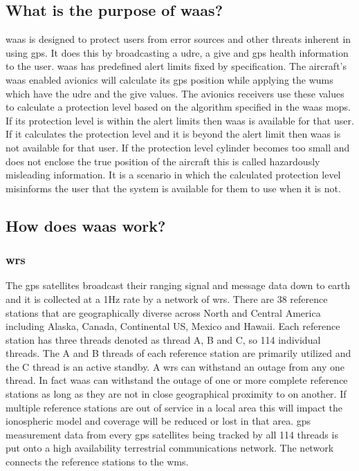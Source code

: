 \subsection{What is the purpose of
\ac{waas}?}\label{what-is-the-purpose-of-waas}

\ac{waas} is designed to protect users from error sources and other threats
inherent in using \ac{gps}. It does this by broadcasting a \ac{udre}, a \ac{give} and \ac{gps}
health information to the user. \ac{waas} has predefined alert limits fixed
by specification. The aircraft's \ac{waas} enabled avionics will calculate
its \ac{gps} position while applying the \acp{wum} which have the
\ac{udre} and the \ac{give} values. The avionics receivers use these values to
calculate a protection level based on the algorithm specified in the
\ac{waas} \ac{mops}. If its protection level is within the alert limits then \ac{waas}
is available for that user. If it calculates the protection level and it
is beyond the alert limit then \ac{waas} is not available for that user. If
the protection level cylinder becomes too small and does not enclose the
true position of the aircraft this is called hazardously misleading
information. It is a scenario in which the calculated protection level
misinforms the user that the system is available for them to use when it
is not.

\subsection{How does \ac{waas} work?}\label{how-does-waas-work}

\subsubsection{\ac{wrs}}\label{waas-reference-stations}

The \ac{gps} satellites broadcast their ranging signal and message data down
to earth and it is collected at a 1Hz rate by a network of \ac{wrs}. There are 38 reference stations that are
geographically diverse across North and Central America including
Alaska, Canada, Continental US, Mexico and Hawaii. Each reference
station has three threads denoted as thread A, B and C, so 114
individual threads. The A and B threads of each reference station are
primarily utilized and the C thread is an active standby. A \ac{wrs} can
withstand an outage from any one thread. In fact \ac{waas} can withstand the
outage of one or more complete reference stations as long as they are
not in close geographical proximity to on another. If multiple reference
stations are out of service in a local area this will impact the
ionospheric model and coverage will be reduced or lost in that area. \ac{gps}
measurement data from every \ac{gps} satellites being tracked by all 114
threads is put onto a high availability terrestrial communications
network. The network connects the reference stations to the \ac{wms}.

